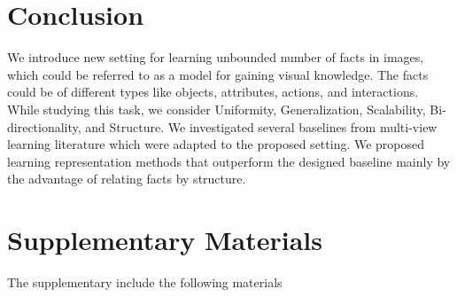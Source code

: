 \documentclass[runningheads]{llncs}
\begin{document}
\section{Conclusion}

We introduce new setting  for learning unbounded number of facts in images, which could be referred to as a model for gaining visual knowledge. The facts could be of different types like objects, attributes, actions, and interactions.  While studying this task, we consider  Uniformity, Generalization, Scalability, Bi-directionality, and Structure. We investigated several baselines from multi-view learning literature which were adapted to the proposed setting. We proposed learning representation methods that outperform the designed baseline mainly by the advantage of relating facts by structure.


\clearpage




\clearpage
\section*{Supplementary Materials}

The supplementary include the following materials

\end{document}
